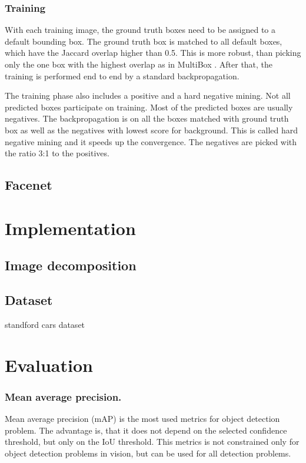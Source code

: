 \documentclass[a4paper,12pt,titlepage]{article}
\numberwithin{figure}{section}
\begin{document}
\subsubsection{Training}
With each training image, the ground truth boxes need to be assigned to a default bounding box. The ground truth box is matched to all default boxes, which have the Jaccard overlap higher than 0.5. This is more robust, than picking only the one box with the highest overlap as in MultiBox \cite{erhan2014scalable}. After that, the training is performed end to end by a standard backpropagation. 

The training phase also includes a positive and a hard negative mining. Not all predicted boxes participate on training. Most of the predicted boxes are usually negatives. The backpropagation is on all the boxes matched with ground truth box as well as the negatives with lowest score for background. This is called hard negative mining and it speeds up the convergence. The negatives are picked with the ratio 3:1 to the positives.





\subsection{Facenet}
\label{sec:facenet}




\section{Implementation}

\subsection{Image decomposition}
\label{sec:decomposition}

\subsection{Dataset}
\label{sec:ssd-dataset}
standford \cite{standford} cars dataset




\section{Evaluation}



\subsubsection{Mean average precision.}
\label{sec:mAP}
Mean average precision (mAP) is the most used metrics for object detection problem. The advantage is, that it does not depend on the selected confidence threshold, but only on the IoU threshold. This metrics is not constrained only for object detection problems in vision, but can be used for all detection problems. 
\end{document}
